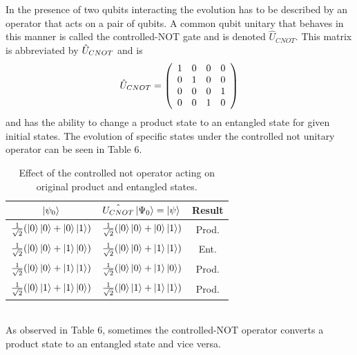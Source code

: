 \documentclass[twocolumn]{article}
\begin{document}
In the presence of two qubits interacting the evolution has to be described by an operator that acts on a pair of qubits. A common qubit unitary that behaves in this manner is called the controlled-NOT gate and is denoted $\hat{U}_{CNOT}$. This matrix is abbreviated by $\hat{U}_{\tiny{CNOT}}$ and is
\begin{equation} \label{eq:33}
\hat{U}_{\tiny{CNOT}}=
\left(\begin{array}{cccc}
1 & 0 & 0 & 0 \\
0 & 1 & 0 & 0 \\
0 & 0 & 0 & 1 \\
0 & 0 & 1 & 0 \\
\end{array}\right)
\end{equation}
and has the ability to change a product state to an entangled state for given initial states. The evolution of specific states under the controlled not unitary operator can be seen in Table 6.
\begin{table}[h!]
\begin{center}
\begin{tabular}{ |c|c|c| }
\hline $\ket{\psi_0}$ & $\hat{U_{CNOT}}\ket{\Psi_0}=\ket{\psi}$ & Result \\
\hline $\frac{1}{\sqrt{2}}(\ket{0}\ket{0}+\ket{0}\ket{1})$ & $\frac{1}{\sqrt{2}}(\ket{0}\ket{0}+\ket{0}\ket{1})$ & Prod. \\
\hline $\frac{1}{\sqrt{2}}(\ket{0}\ket{0}+\ket{1}\ket{0})$ & $\frac{1}{\sqrt{2}}(\ket{0}\ket{0}+\ket{1}\ket{1})$ & Ent. \\
\hline $\frac{1}{\sqrt{2}}(\ket{0}\ket{0}+\ket{1}\ket{1})$ & $\frac{1}{\sqrt{2}}(\ket{0}\ket{0}+\ket{1}\ket{0})$ & Prod. \\
\hline $\frac{1}{\sqrt{2}}(\ket{0}\ket{1}+\ket{1}\ket{0})$ & $\frac{1}{\sqrt{2}}(\ket{0}\ket{1}+\ket{1}\ket{1})$ & Prod. \\
\hline 
\end{tabular}
\caption{Effect of the controlled not operator acting on original product and entangled states.}
\end{center}
\end{table} \\
As observed in Table 6, sometimes the controlled-NOT operator converts a product state to an entangled state and vice versa.
\end{document}
